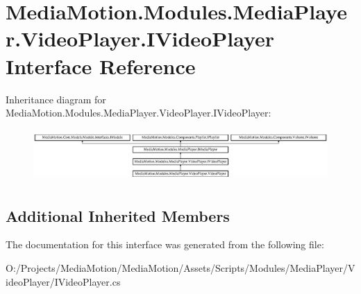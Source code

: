 \hypertarget{interface_media_motion_1_1_modules_1_1_media_player_1_1_video_player_1_1_i_video_player}{\section{Media\+Motion.\+Modules.\+Media\+Player.\+Video\+Player.\+I\+Video\+Player Interface Reference}
\label{interface_media_motion_1_1_modules_1_1_media_player_1_1_video_player_1_1_i_video_player}
}
Inheritance diagram for Media\+Motion.\+Modules.\+Media\+Player.\+Video\+Player.\+I\+Video\+Player\+:\begin{figure}[H]
\begin{center}
\leavevmode
\includegraphics[height=2.007169cm]{interface_media_motion_1_1_modules_1_1_media_player_1_1_video_player_1_1_i_video_player}
\end{center}
\end{figure}
\subsection*{Additional Inherited Members}


The documentation for this interface was generated from the following file\+:\begin{DoxyCompactItemize}
\item 
O\+:/\+Projects/\+Media\+Motion/\+Media\+Motion/\+Assets/\+Scripts/\+Modules/\+Media\+Player/\+Video\+Player/I\+Video\+Player.\+cs\end{DoxyCompactItemize}
